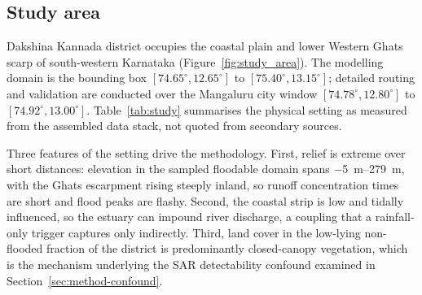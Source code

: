 \documentclass[11pt,a4paper]{article}
\begin{document}
\subsection{Study area}
Dakshina Kannada district occupies the coastal plain and lower Western Ghats
scarp of south-western Karnataka (Figure~\ref{fig:study_area}). The modelling
domain is the bounding box $[74.65^\circ, 12.65^\circ]$ to
$[75.40^\circ, 13.15^\circ]$; detailed routing and validation are conducted over
the Mangaluru city window $[74.78^\circ, 12.80^\circ]$ to
$[74.92^\circ, 13.00^\circ]$. Table~\ref{tab:study} summarises the physical
setting as measured from the assembled data stack, not quoted from
secondary sources.

Three features of the setting drive the methodology. First, relief is extreme
over short distances: elevation in the sampled floodable domain spans
\SIrange{-5}{279}{\metre}, with the Ghats escarpment rising steeply inland, so
runoff concentration times are short and flood peaks are flashy. Second, the
coastal strip is low and tidally influenced, so the estuary can impound river
discharge, a coupling that a rainfall-only trigger captures only indirectly.
Third, land cover in the low-lying non-flooded fraction of the district is
predominantly closed-canopy vegetation, which is the mechanism underlying the
SAR detectability confound examined in Section~\ref{sec:method-confound}.
\end{document}
